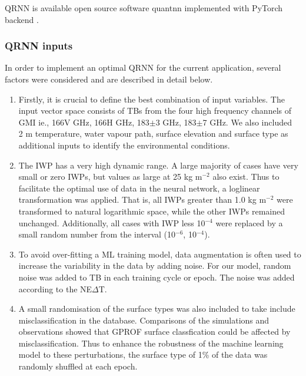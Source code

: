 \documentclass[amt, manuscript]{copernicus}
\begin{document}
QRNN is available open source software quantnn \citep{} implemented with PyTorch backend \citep{paszke2017automatic}.


\subsubsection{QRNN inputs}

In order to implement an optimal QRNN for the current application, several factors were considered and are described in detail below. 

\begin{enumerate}
	
	\item  Firstly, it is crucial to define the best combination of input variables. The input vector space consists of TBs from the four high frequency channels of GMI ie., 166V\,\,GHz, 166H\,\,GHz, 183$\pm$3\,\,GHz, 183$\pm$7\,\,GHz. We also included 2\,\,m temperature, water vapour path, surface elevation and surface type as additional inputs to identify the environmental conditions. 
	
	\item The IWP has a very high dynamic range. A large majority of cases have very small or zero IWPs, but values as large at 25\,\,kg m$^{-2}$ also exist. Thus to facilitate the optimal use of data in the neural network, a loglinear transformation was applied. That is, all IWPs greater than 1.0\,\,kg m$^{-2}$  were transformed to natural logarithmic space, while the other IWPs remained unchanged. Additionally, all cases with IWP less 10$^{-4}$ were replaced by a small random number from the interval (10$^{-6}$, 10$^{-4}$).
	
	
	\item To avoid over-fitting a ML training model, data augmentation is often used to increase the variability in the data by adding noise. For our model, random noise was added to TB in each training cycle or epoch. The noise was added according to the NE$\Delta$T. 
	
	\item A small randomisation of the surface types was also included to take include misclassification in the database. Comparisons of the simulations and observations showed that GPROF surface classfication could be affected by misclassification. Thus to enhance the robustness of the machine learning model to these perturbations, the surface type of 1\% of the data was randomly shuffled at each epoch. 
	
	
	\end{enumerate}
\end{document}
